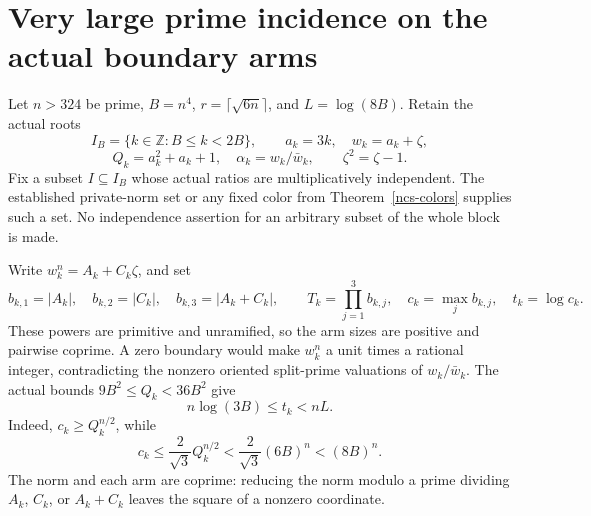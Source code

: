 \section{Very large prime incidence on the actual boundary arms}
\label{vlg-section}

Let \(n>324\) be prime, \(B=n^4\), \(r=\lceil\sqrt{6n}\rceil\),
and \(L=\log(8B)\). Retain the actual roots
\[
 I_B=\{k\in\mathbb Z:B\leq k<2B\},\qquad
 a_k=3k,\quad w_k=a_k+\zeta,
\]
\[
 Q_k=a_k^2+a_k+1,\quad \alpha_k=w_k/\bar w_k,
 \qquad \zeta^2=\zeta-1.
\]
Fix a subset \(I\subseteq I_B\) whose actual ratios are
multiplicatively independent. The established private-norm set
or any fixed color from Theorem~\ref{ncs-colors} supplies such a set.
No independence assertion for an arbitrary subset of the whole block
is made.

Write \(w_k^n=A_k+C_k\zeta\), and set
\[
 b_{k,1}=|A_k|,\quad b_{k,2}=|C_k|,\quad
 b_{k,3}=|A_k+C_k|,\qquad
 T_k=\prod_{j=1}^3b_{k,j},\quad
 c_k=\max_j b_{k,j},\quad t_k=\log c_k.
\]
These powers are primitive and unramified, so the arm sizes are
positive and pairwise coprime. A zero boundary would make \(w_k^n\)
a unit times a rational integer, contradicting the nonzero oriented
split-prime valuations of \(w_k/\bar w_k\).
The actual bounds \(9B^2\leq Q_k<36B^2\) give
\begin{equation}\label{vlg-height}
 n\log(3B)\leq t_k<nL.
\end{equation}
Indeed, \(c_k\geq Q_k^{n/2}\), while
\[
 c_k\leq\frac2{\sqrt3}Q_k^{n/2}
       <\frac2{\sqrt3}(6B)^n<(8B)^n.
\]
The norm and each arm are coprime: reducing the norm modulo a prime
dividing \(A_k\), \(C_k\), or \(A_k+C_k\) leaves the square of a
nonzero coordinate.

